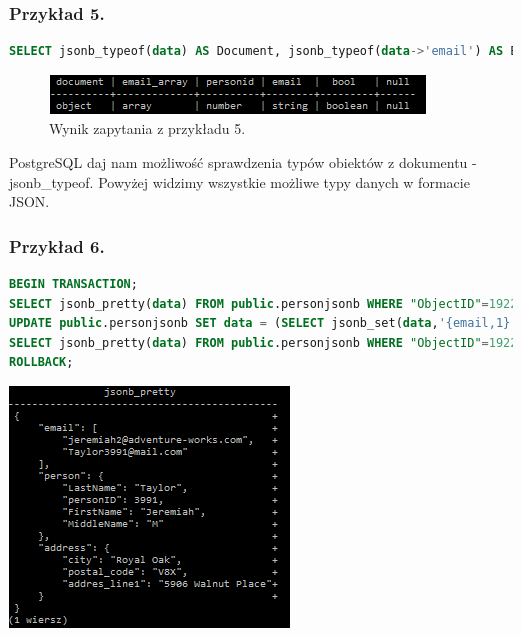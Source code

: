 \documentclass[a4paper,12pt,table]{article}
\begin{document}
{\subsubsection*{Przykład 5.}
\begin{lstlisting}[language=SQL,basicstyle=\footnotesize]
SELECT jsonb_typeof(data) AS Document, jsonb_typeof(data->'email') AS Email_Array, jsonb_typeof(data->'person'->'personID') AS PersonID, jsonb_typeof(data->'email'->0) AS Email, jsonb_typeof('true') AS Bool, jsonb_typeof('null') AS Null FROM personjsonb LIMIT 1;
\end{lstlisting}
\vspace{0.5cm}
\begin{figure}[h]
\begin{center}
\includegraphics[scale=1]{sc/35}
\end{center}
\caption{Wynik zapytania z przykładu 5.}
\end{figure}%

PostgreSQL daj nam możliwość sprawdzenia typów obiektów z dokumentu - jsonb\_typeof. Powyżej widzimy wszystkie możliwe typy danych w formacie JSON.
\newpage
\subsubsection*{Przykład 6.}
\begin{lstlisting}[language=SQL,basicstyle=\footnotesize]
BEGIN TRANSACTION;
SELECT jsonb_pretty(data) FROM public.personjsonb WHERE "ObjectID"=1922;
UPDATE public.personjsonb SET data = (SELECT jsonb_set(data,'{email,1}','"newmail@hotmail.com"',false) FROM public.personjsonb WHERE "ObjectID"=1922) WHERE "ObjectID"=1922;
SELECT jsonb_pretty(data) FROM public.personjsonb WHERE "ObjectID"=1922;
ROLLBACK;
\end{lstlisting}
\vspace{0.65cm}
\begin{minipage}{0.5\textwidth}
\makeatletter
\def\@captype{figure}
\makeatother
\begin{center}
\includegraphics[scale=1]{sc/36}
\caption{Przed modyfikacją}
\end{center}


\end{minipage}}
\end{document}
